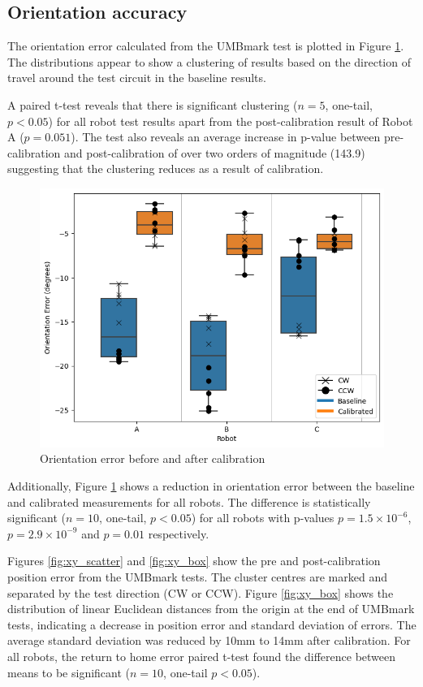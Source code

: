 \documentclass[conference]{IEEEtran}
\begin{document}
\subsection{Orientation accuracy}

The orientation error calculated from the UMBmark test is plotted in Figure \ref{fig:orientation}. The distributions appear to show a clustering of results based on the direction of travel around the test circuit in the baseline results.

A paired t-test reveals that there is significant clustering ($n = 5$, one-tail, $p < 0.05$) for all robot test results apart from the post-calibration result of Robot A ($p=0.051$). The test also reveals an average increase in p-value between pre-calibration and post-calibration of over two orders of magnitude (143.9) suggesting that the clustering reduces as a result of calibration. 

\begin{figure}[h!]
    \centering
    \includegraphics[width=.49\textwidth]{img/orientation_error.png}
    \caption{Orientation error before and after calibration}
    \label{fig:orientation}
\end{figure}



Additionally, Figure \ref{fig:orientation} shows a reduction in orientation error between the baseline and calibrated measurements for all robots. The difference is statistically significant ($n = 10$, one-tail, $p < 0.05$) for all robots with p-values $p=1.5\times10^{-6}$, $p=2.9\times10^{-9}$ and $p=0.01$ respectively. 

Figures \ref{fig:xy_scatter} and \ref{fig:xy_box} show the pre and post-calibration position error from the UMBmark tests. 
The cluster centres are marked and separated by the test direction (CW or CCW).
Figure \ref{fig:xy_box} shows the distribution of linear Euclidean distances from the origin at the end of UMBmark tests, indicating a decrease in position error and standard deviation of errors. 
The average standard deviation was reduced by 10mm to 14mm after calibration.
For all robots, the return to home error paired t-test found the difference between means to be significant ($n = 10$, one-tail $p < 0.05$). 
\end{document}
